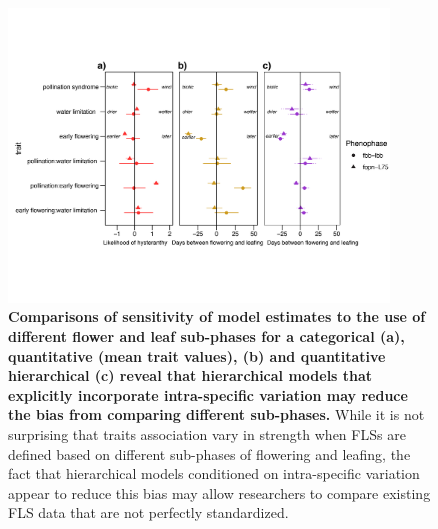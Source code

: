\documentclass[11pt]{article}
\begin{document}
\begin{figure}[H]
\centering
\includegraphics[width=0.9\textwidth]{..//..//HFmodelplots4SUPP-01.png} 
  \caption{\textbf{Comparisons of sensitivity of model estimates to the use of different flower and leaf sub-phases for a categorical  \textbf{(a)}, quantitative (mean trait values), \textbf{(b)} and quantitative hierarchical \textbf{(c)} reveal that hierarchical models that explicitly incorporate intra-specific variation may reduce the bias from comparing different sub-phases.} While it is not surprising that traits association vary in strength when FLSs are defined based on different sub-phases of flowering and leafing, the fact that hierarchical models conditioned on intra-specific variation appear to reduce this bias may allow researchers to compare existing FLS data that are not perfectly standardized.}
    \label{fig:sensitivity}
    \end{figure}
\end{document}
